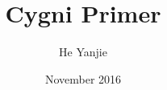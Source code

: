 \documentclass[a4paper,12pt]{book}
\begin{document}
\author{He Yanjie}
\title{Cygni Primer}
\date{November 2016}

\frontmatter
\maketitle
\tableofcontents

\mainmatter










\backmatter
\end{document}
